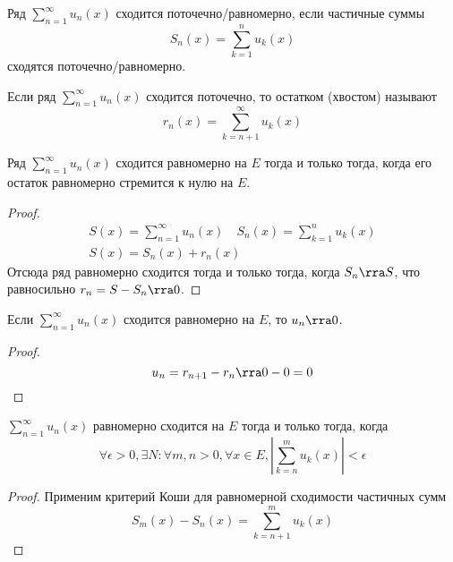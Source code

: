 \begin{Def}
	Ряд $\sum_{n=1}^\infty u_n(x)$ сходится поточечно/равномерно, если частичные суммы
	\[ S_n(x) = \sum_{k=1}^n u_k(x) \]
	сходятся поточечно/равномерно.
\end{Def}

\begin{Def}
	Если ряд $\sum_{n=1}^\infty u_n(x)$ сходится поточечно, то остатком (хвостом) называют
	\[ r_n(x) = \sum_{k=n+1}^\infty u_k(x) \]
\end{Def}

\begin{theorem}
	Ряд $\sum_{n=1}^\infty u_n(x)$ сходится равномерно на $E$ тогда и только тогда, когда его остаток равномерно стремится к нулю на $E$.
\end{theorem}
\begin{proof}
	\begin{gather*}
		S(x) = \sum_{n=1}^\infty u_n(x) \quad S_n(x) = \sum_{k=1}^n u_k(x) \\
		S(x) = S_n(x) + r_n(x)
	\end{gather*}
	Отсюда ряд равномерно сходится тогда и только тогда, когда $S_n \rra S$, что равносильно $r_n = S - S_n \rra 0$.
\end{proof}

\begin{conseq}
	Если $\sum_{n=1}^\infty u_n(x)$ сходится равномерно на $E$, то $u_n \rra 0$.
\end{conseq}
\begin{proof}
	\[ u_n = r_{n+1} - r_n \rra 0 - 0 = 0 \]
\end{proof}

\begin{theorem}
	$\sum_{n=1}^\infty u_n(x)$ равномерно сходится на $E$ тогда и только тогда, когда
	\[ \forall \epsilon > 0, \exists N\colon \forall m, n > 0, \forall x \in E, \left| \sum_{k=n}^m u_k(x) \right| < \epsilon \]
\end{theorem}
\begin{proof}
	Применим критерий Коши для равномерной сходимости частичных сумм
	\[ S_m(x) - S_n(x) = \sum_{k=n+1}^m u_k(x) \]
\end{proof}

